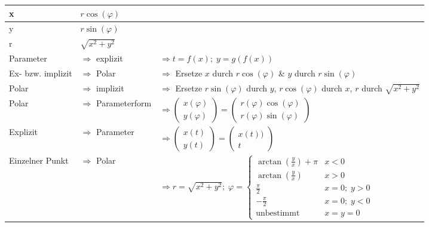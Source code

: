 \renewcommand{\arraystretch}{1,5}
\begin{tabular}{|p{3cm}|p{3cm}|p{10.5cm}|}
\hline
x & $r \cos(\varphi)$ & \\
\hline
y & $r \sin(\varphi)$ & \\
\hline
r & $\sqrt{x^2 + y^2}$ & \\
\hline
Parameter 
  & $\Rightarrow$ explizit
  & $\Longrightarrow t = f(x);\; y = g(f(x))$\\
  \hline
Ex- bzw. implizit 
  & $\Rightarrow$ Polar
  & $\Longrightarrow$ Ersetze $x$ durch $r
  \cos(\varphi)$ \& $y$ durch $r \sin(\varphi)$\\
  \hline
Polar 
  & $\Rightarrow$ implizit
  & $\Longrightarrow$ Ersetze $r \sin(\varphi)$ durch $y$, $r \cos(\varphi)$
  durch $x$, $r$ durch $\sqrt{x^2 + y^2}$\\ 
  \hline
Polar
  & $\Rightarrow$ Parameterform
  & $\Longrightarrow \left( \begin{array} {l} x(\varphi) \\ y(\varphi) \end{array} \right) =
          \left( \begin{array} {l} r(\varphi) \cos(\varphi) \\ r(\varphi) \sin(\varphi) \end{array}
          \right)$ \\
          \hline
Explizit
  & $\Rightarrow$ Parameter
  & $\Longrightarrow \left( \begin{array} {l} x(t) \\ y(t) \end{array} \right) =
          \left( \begin{array} {l} x(t)) \\ t \end{array}
          \right)$ \\
          \hline
Einzelner Punkt  
  & $\Rightarrow$ Polar
  & $\Longrightarrow r = \sqrt{x^2 + y^2};\;
  \varphi = \begin{cases}\arctan(\frac{y}{x}) + \pi   &x < 0\\
             \arctan(\frac{y}{x})   & x > 0\\
             \frac{\pi}{2}      & x = 0;\; y > 0\\
             -\frac{\pi}{2}     & x = 0;\; y < 0\\
             \text{unbestimmt}    & x = y = 0\end{cases}$\\
             \hline
\end{tabular}

